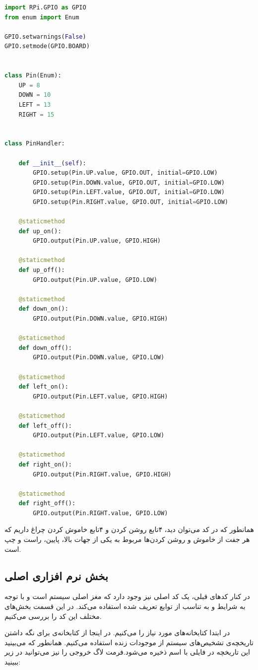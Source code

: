 \begin{latin}
\begin{lstlisting}[language=python]
import RPi.GPIO as GPIO
from enum import Enum

GPIO.setwarnings(False)
GPIO.setmode(GPIO.BOARD)


class Pin(Enum):
    UP = 8
    DOWN = 10
    LEFT = 13
    RIGHT = 15


class PinHandler:

    def __init__(self):
        GPIO.setup(Pin.UP.value, GPIO.OUT, initial=GPIO.LOW)
        GPIO.setup(Pin.DOWN.value, GPIO.OUT, initial=GPIO.LOW)
        GPIO.setup(Pin.LEFT.value, GPIO.OUT, initial=GPIO.LOW)
        GPIO.setup(Pin.RIGHT.value, GPIO.OUT, initial=GPIO.LOW)

    @staticmethod
    def up_on():
        GPIO.output(Pin.UP.value, GPIO.HIGH)

    @staticmethod
    def up_off():
        GPIO.output(Pin.UP.value, GPIO.LOW)

    @staticmethod
    def down_on():
        GPIO.output(Pin.DOWN.value, GPIO.HIGH)

    @staticmethod
    def down_off():
        GPIO.output(Pin.DOWN.value, GPIO.LOW)

    @staticmethod
    def left_on():
        GPIO.output(Pin.LEFT.value, GPIO.HIGH)

    @staticmethod
    def left_off():
        GPIO.output(Pin.LEFT.value, GPIO.LOW)

    @staticmethod
    def right_on():
        GPIO.output(Pin.RIGHT.value, GPIO.HIGH)

    @staticmethod
    def right_off():
        GPIO.output(Pin.RIGHT.value, GPIO.LOW)


\end{lstlisting}
\end{latin}

همانطور که در کد می‌توان دید، ۴تابع روشن کردن و ۴تابع خاموش کردن چراغ داریم که هر جفت از خاموش و روشن کردن‌ها مربوط به یکی از جهات بالا، پایین، راست و چپ است.

\subsection{بخش نرم افزاری اصلی}
در کنار کد‌های قبلی، یک کد اصلی نیز وجود دارد که مغز اصلی سیستم است و با توجه به شرایط و به تناسب از توابع تعریف شده استفاده می‌کند. در این قسمت بخش‌های مختلف این کد را بررسی‌ می‌کنیم.

در ابتدا کتابخانه‌های مورد نیاز را  می‌کنیم. در اینجا از کتابخانه‌ی  برای نگه داشتن تاریخچه‌ی تشخیص‌های سیستم از موجودات زنده استفاده می‌کنیم. همانطور که می‌بینید این تاریخچه در فایلی با اسم  ذخیره می‌شود.فرمت لاگ خروجی را نیز می‌توانید در زیر ببینید:

